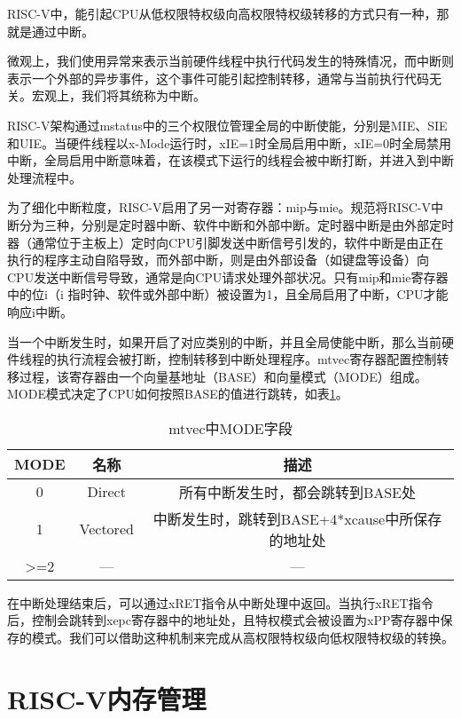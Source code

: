 RISC-V中，能引起CPU从低权限特权级向高权限特权级转移的方式只有一种，那就是通过中断。

微观上，我们使用异常来表示当前硬件线程中执行代码发生的特殊情况，而中断则表示一个外部的异步事件，这个事件可能引起控制转移，通常与当前执行代码无关。宏观上，我们将其统称为中断。

RISC-V架构通过mstatus中的三个权限位管理全局的中断使能，分别是MIE、SIE和UIE。当硬件线程以x-Mode运行时，xIE=1时全局启用中断，xIE=0时全局禁用中断，全局启用中断意味着，在该模式下运行的线程会被中断打断，并进入到中断处理流程中。

为了细化中断粒度，RISC-V启用了另一对寄存器：mip与mie。规范将RISC-V中断分为三种，分别是定时器中断、软件中断和外部中断。定时器中断是由外部定时器（通常位于主板上）定时向CPU引脚发送中断信号引发的，软件中断是由正在执行的程序主动自陷导致，而外部中断，则是由外部设备（如键盘等设备）向CPU发送中断信号导致，通常是向CPU请求处理外部状况。只有mip和mie寄存器中的位i（i 指时钟、软件或外部中断）被设置为1，且全局启用了中断，CPU才能响应i中断。

当一个中断发生时，如果开启了对应类别的中断，并且全局使能中断，那么当前硬件线程的执行流程会被打断，控制转移到中断处理程序。mtvec寄存器配置控制转移过程，该寄存器由一个向量基地址（BASE）和向量模式（MODE）组成。MODE模式决定了CPU如何按照BASE的值进行跳转，如表\ref{tab:mtvec}。

\begin{table}[h]
	\centering
	\setlength{\belowcaptionskip}{2pt}
	\caption{mtvec中MODE字段}
	\label{tab:mtvec}
	\begin{tabular}{|c|c|c|}
		\hline
		MODE             & 名称       & 描述                                        \\ \hline
		0                & Direct   & 所有中断发生时，都会跳转到BASE处                        \\ \hline
		1                & Vectored & 中断发生时，跳转到BASE+4*xcause中所保存的地址处 \\ \hline
		\textgreater{}=2 & —        & —                                         \\ \hline
	\end{tabular}
\end{table}

在中断处理结束后，可以通过xRET指令从中断处理中返回。当执行xRET指令后，控制会跳转到xepc寄存器中的地址处，且特权模式会被设置为xPP寄存器中保存的模式。我们可以借助这种机制来完成从高权限特权级向低权限特权级的转换。

\section{RISC-V内存管理}

